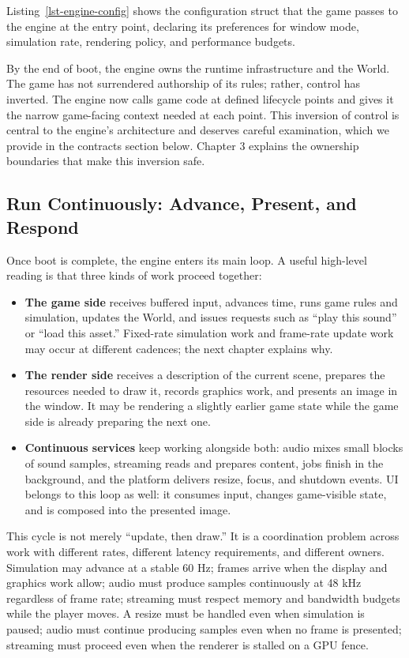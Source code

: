 \documentclass[
  11pt,
  letterpaper,
  DIV=11,
  numbers=noendperiod,
  twoside,
  open=right]{scrreprt}
\providecommand{\tightlist}{%
  \setlength{\itemsep}{0pt}\setlength{\parskip}{0pt}}
\begin{document}
Listing~\ref{lst-engine-config} shows the configuration struct that the
game passes to the engine at the entry point, declaring its preferences
for window mode, simulation rate, rendering policy, and performance
budgets.

By the end of boot, the engine owns the runtime infrastructure and the
World. The game has not surrendered authorship of its rules; rather,
control has inverted. The engine now calls game code at defined
lifecycle points and gives it the narrow game-facing context needed at
each point. This inversion of control is central to the engine's
architecture and deserves careful examination, which we provide in the
contracts section below. Chapter 3 explains the ownership boundaries
that make this inversion safe.

\subsection{Run Continuously: Advance, Present, and
Respond}\label{run-continuously-advance-present-and-respond}

Once boot is complete, the engine enters its main loop. A useful
high-level reading is that three kinds of work proceed together:

\begin{itemize}
\tightlist
\item
  \textbf{The game side} receives buffered input, advances time, runs
  game rules and simulation, updates the World, and issues requests such
  as ``play this sound'' or ``load this asset.'' Fixed-rate simulation
  work and frame-rate update work may occur at different cadences; the
  next chapter explains why.
\item
  \textbf{The render side} receives a description of the current scene,
  prepares the resources needed to draw it, records graphics work, and
  presents an image in the window. It may be rendering a slightly
  earlier game state while the game side is already preparing the next
  one.
\item
  \textbf{Continuous services} keep working alongside both: audio mixes
  small blocks of sound samples, streaming reads and prepares content,
  jobs finish in the background, and the platform delivers resize,
  focus, and shutdown events. UI belongs to this loop as well: it
  consumes input, changes game-visible state, and is composed into the
  presented image.
\end{itemize}

This cycle is not merely ``update, then draw.'' It is a coordination
problem across work with different rates, different latency
requirements, and different owners. Simulation may advance at a stable
60 Hz; frames arrive when the display and graphics work allow; audio
must produce samples continuously at 48 kHz regardless of frame rate;
streaming must respect memory and bandwidth budgets while the player
moves. A resize must be handled even when simulation is paused; audio
must continue producing samples even when no frame is presented;
streaming must proceed even when the renderer is stalled on a GPU fence.
\end{document}
